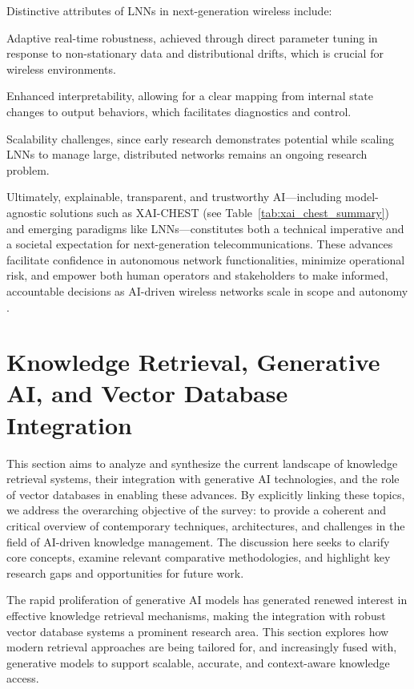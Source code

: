 \documentclass[sigconf]{acmart}
\begin{document}
Distinctive attributes of LNNs in next-generation wireless include:

Adaptive real-time robustness, achieved through direct parameter tuning in response to non-stationary data and distributional drifts, which is crucial for wireless environments.

Enhanced interpretability, allowing for a clear mapping from internal state changes to output behaviors, which facilitates diagnostics and control.

Scalability challenges, since early research demonstrates potential while scaling LNNs to manage large, distributed networks remains an ongoing research problem.

Ultimately, explainable, transparent, and trustworthy AI—including model-agnostic solutions such as XAI-CHEST (see Table~\ref{tab:xai_chest_summary}) and emerging paradigms like LNNs—constitutes both a technical imperative and a societal expectation for next-generation telecommunications. These advances facilitate confidence in autonomous network functionalities, minimize operational risk, and empower both human operators and stakeholders to make informed, accountable decisions as AI-driven wireless networks scale in scope and autonomy \cite{ref41}.

\section{Knowledge Retrieval, Generative AI, and Vector Database Integration}

This section aims to analyze and synthesize the current landscape of knowledge retrieval systems, their integration with generative AI technologies, and the role of vector databases in enabling these advances. By explicitly linking these topics, we address the overarching objective of the survey: to provide a coherent and critical overview of contemporary techniques, architectures, and challenges in the field of AI-driven knowledge management. The discussion here seeks to clarify core concepts, examine relevant comparative methodologies, and highlight key research gaps and opportunities for future work.

The rapid proliferation of generative AI models has generated renewed interest in effective knowledge retrieval mechanisms, making the integration with robust vector database systems a prominent research area. This section explores how modern retrieval approaches are being tailored for, and increasingly fused with, generative models to support scalable, accurate, and context-aware knowledge access.
\end{document}
